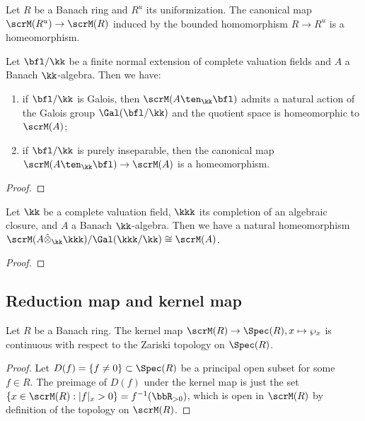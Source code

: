 \begin{corollary}\label{cor:norm_spectrum_of_banach_rings_and_its_uniformization}
	Let \(R\) be a Banach ring and \(R^u\) its uniformization.
	The canonical map \(\scrM(R^u) \to \scrM(R)\) induced by the bounded homomorphism \(R \to R^u\) is a homeomorphism.
\end{corollary}

\begin{proposition}\label{prop:the_Galois_action_on_the_spectrum_of_banach_rings}
	Let \(\bfl/\kk\) be a finite normal extension of complete valuation fields and \(A\) a Banach \(\kk\)-algebra.
	Then we have:
	\begin{enumerate}
		\item if \(\bfl/\kk\) is Galois, then \(\scrM(A \ten_\kk \bfl)\) admits a natural action of the Galois group \(\Gal(\bfl/\kk)\) and the quotient space is homeomorphic to \(\scrM(A)\);
		\item if \(\bfl/\kk\) is purely inseparable, then the canonical map \(\scrM(A \ten_\kk \bfl) \to \scrM(A)\) is a homeomorphism.
	\end{enumerate}
\end{proposition}
\begin{proof}
\end{proof}

\begin{corollary}\label{cor:spectrum_of_banach_algebra_over_field_and_its_complete_algebraically_closed_field}
	Let \(\kk\) be a complete valuation field, \(\kkk\) its completion of an algebraic closure, and \(A\) a Banach \(\kk\)-algebra.
	Then we have a natural homeomorphism \(\scrM(A \hat{\otimes}_\kk \kkk)/\Gal(\kkk/\kk) \cong \scrM(A)\).
\end{corollary}
\begin{proof}
\end{proof}




\subsection{Reduction map and kernel map}

\begin{proposition}\label{prop:kernel_map_from_M_R_to_Spec_R}
	Let \(R\) be a Banach ring.
	The kernel map \(\scrM(R) \to \Spec(R), x \mapsto \wp_x\) is continuous with respect to the Zariski topology on \(\Spec(R)\).
\end{proposition}
\begin{proof}
	Let \(D(f) = \{f\neq 0\} \subset \Spec(R)\) be a principal open subset for some \(f \in R\).
	The preimage of \(D(f)\) under the kernel map is just the set \(\{x \in \scrM(R) : |f|_x > 0\} = f^{-1}(\bbR_{>0})\),
	which is open in \(\scrM(R)\) by definition of the topology on \(\scrM(R)\).
\end{proof}



